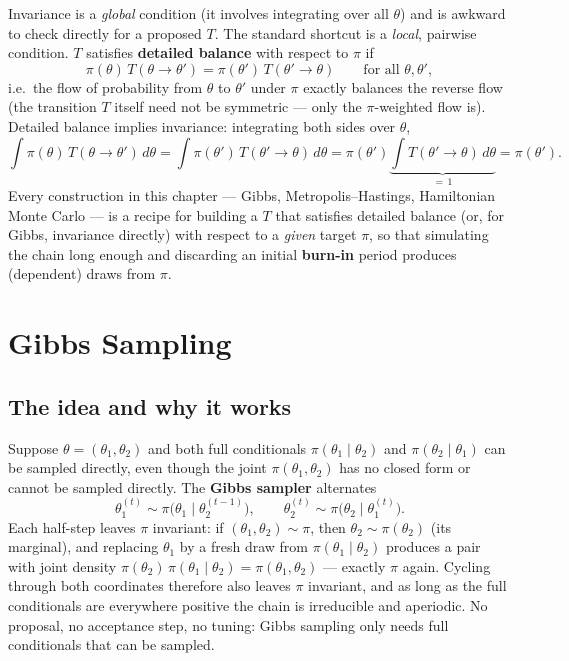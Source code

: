\documentclass[
  letterpaper,
  DIV=11,
  numbers=noendperiod]{scrreprt}
\begin{document}
Invariance is a \emph{global} condition (it involves integrating over
all \(\theta\)) and is awkward to check directly for a proposed \(T\).
The standard shortcut is a \emph{local}, pairwise condition. \(T\)
satisfies \textbf{detailed balance} with respect to \(\pi\) if \[
\pi(\theta)\, T(\theta \to \theta') = \pi(\theta')\, T(\theta' \to \theta) \qquad \text{for all } \theta, \theta',
\] i.e.~the flow of probability from \(\theta\) to \(\theta'\) under
\(\pi\) exactly balances the reverse flow (the transition \(T\) itself
need not be symmetric --- only the \(\pi\)-weighted flow is). Detailed
balance implies invariance: integrating both sides over \(\theta\), \[
\int \pi(\theta)\, T(\theta \to \theta') \, d\theta = \int \pi(\theta')\, T(\theta' \to \theta) \, d\theta
= \pi(\theta') \underbrace{\int T(\theta' \to \theta)\, d\theta}_{=\,1} = \pi(\theta').
\] Every construction in this chapter --- Gibbs, Metropolis--Hastings,
Hamiltonian Monte Carlo --- is a recipe for building a \(T\) that
satisfies detailed balance (or, for Gibbs, invariance directly) with
respect to a \emph{given} target \(\pi\), so that simulating the chain
long enough and discarding an initial \textbf{burn-in} period produces
(dependent) draws from \(\pi\).

\section{Gibbs Sampling}\label{gibbs-sampling}

\subsection{The idea and why it works}\label{the-idea-and-why-it-works}

Suppose \(\theta = (\theta_1, \theta_2)\) and both full conditionals
\(\pi(\theta_1 \mid \theta_2)\) and \(\pi(\theta_2 \mid \theta_1)\) can
be sampled directly, even though the joint \(\pi(\theta_1, \theta_2)\)
has no closed form or cannot be sampled directly. The \textbf{Gibbs
sampler} alternates \[
\theta_1^{(t)} \sim \pi\big(\theta_1 \mid \theta_2^{(t-1)}\big), \qquad
\theta_2^{(t)} \sim \pi\big(\theta_2 \mid \theta_1^{(t)}\big).
\] Each half-step leaves \(\pi\) invariant: if
\((\theta_1, \theta_2) \sim \pi\), then \(\theta_2 \sim \pi(\theta_2)\)
(its marginal), and replacing \(\theta_1\) by a fresh draw from
\(\pi(\theta_1 \mid \theta_2)\) produces a pair with joint density
\(\pi(\theta_2)\,\pi(\theta_1 \mid \theta_2) = \pi(\theta_1, \theta_2)\)
--- exactly \(\pi\) again. Cycling through both coordinates therefore
also leaves \(\pi\) invariant, and as long as the full conditionals are
everywhere positive the chain is irreducible and aperiodic. No proposal,
no acceptance step, no tuning: Gibbs sampling only needs full
conditionals that can be sampled.
\end{document}

